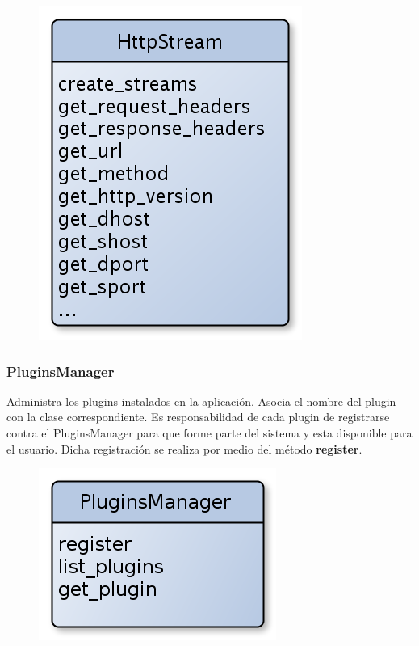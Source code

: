 \begin{figure}[hbtp]
    \centering
	\includegraphics[scale=0.40]{img/HTTPStream.png} 
\end{figure}

\subsubsection{PluginsManager}

Administra los plugins instalados en la aplicación. Asocia el nombre del plugin con la clase correspondiente. Es responsabilidad de cada plugin de registrarse contra el PluginsManager para que forme parte del sistema y esta disponible para el usuario. Dicha registración se realiza por medio del método \textbf{register}.

\begin{figure}[hbtp]
    \centering
	\includegraphics[scale=0.40]{img/PluginsManager.png} 
\end{figure}

